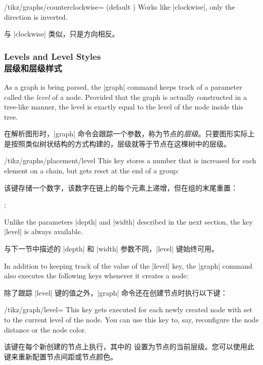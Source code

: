 \label{key-graphs-counterclockwise}%
\begin{key}{/tikz/graphs/counterclockwise= (default \string\tikzgraphVnum)}
    Works like |clockwise|, only the direction is inverted.

    与 |clockwise| 类似，只是方向相反。
\end{key}


\subsubsection{Levels and Level Styles\\层级和层级样式}

As a graph is being parsed, the |graph| command keeps track of a parameter
called the \emph{level} of a node. Provided that the graph is actually
constructed in a tree-like manner, the level is exactly equal to the level of
the node inside this tree.

在解析图形时，|graph| 命令会跟踪一个参数，称为节点的\emph{层级}。只要图形实际上是按照类似树状结构的方式构建的，层级就等于节点在这棵树中的层级。

\begin{key}{/tikz/graphs/placement/level}
    This key stores a number that is increased for each element on a chain, but
    gets reset at the end of a group:
    
    该键存储一个数字，该数字在链上的每个元素上递增，但在组的末尾重置：%
\begin{codeexample}[preamble={\usetikzlibrary{graphs}}]
\tikz {};
\end{codeexample}
    Unlike the parameters |depth| and |width| described in the next section,
    the key |level| is always available.

    与下一节中描述的 |depth| 和 |width| 参数不同，|level| 键始终可用。

\end{key}

In addition to keeping track of the value of the |level| key, the |graph|
command also executes the following keys whenever it creates a node:

除了跟踪 |level| 键的值之外，|graph| 命令还在创建节点时执行以下键：

\begin{stylekey}{/tikz/graph/level=}
    This key gets executed for each newly created node with  set to
    the current level of the node. You can use this key to, say, reconfigure
    the node distance or the node color.

    该键在每个新创建的节点上执行，其中的  设置为节点的当前层级。您可以使用此键来重新配置节点间距或节点颜色。

  \end{stylekey}

